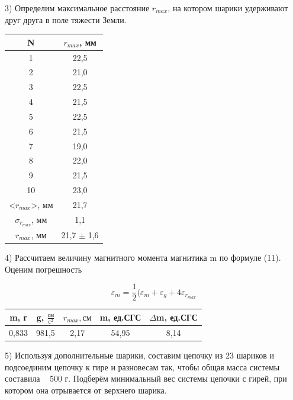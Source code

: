 \documentclass[a4paper,12pt]{article}
\begin{document}
3) Определим максимальное расстояние $r_{max}$, на котором шарики удерживают друг друга в поле тяжести Земли.

\begin{center}
\begin{tabular}{|c|c|}
	\hline
	N & $r_{max}$, мм \\
	\hline
	1 & 22,5 \\
	\hline
	2 & 21,0 \\
	\hline
	3 & 22,5 \\
	\hline
	4 & 21,5 \\
	\hline
	5 & 22,5 \\
	\hline
	6 & 21,5 \\
	\hline
	7 & 19,0 \\
	\hline
	8 & 22,0 \\
	\hline
	9 & 21,5 \\
	\hline
	10 & 23,0 \\
	\hline
	<$r_{max}$>, мм & 21,7 \\
	\hline
	$\sigma_{r_{max}}$, мм & 1,1\\
	\hline
	$r_{max}$, мм & 21,7 $\pm$ 1,6 \\
	\hline
\end{tabular}
\end{center}

4) Рассчитаем величину магнитного момента магнитика m по формуле (11). Оценим погрешность 

$$ \varepsilon_m = \frac{1}{2}(\varepsilon_m + \varepsilon_g + 4\varepsilon_{r_{max}}  $$

\begin{center}
\begin{tabular}{|c|c|c|c|c|}
	\hline
	m, г & g, $\frac{см}{с^2}$ & $r_{max}, см$ & m, ед.СГС & $\Delta$m, ед.СГС \\
	\hline
	0,833 & 981,5 & 2,17 & 54,95 & 8,14 \\
	\hline
\end{tabular}
\end{center}

5) Используя дополнительные шарики, составим цепочку из 23 шариков и подсоединим цепочку к гире и разновесам так, чтобы общая масса системы составила ~ 500 г. Подберём минимальный вес системы цепочки с гирей, при котором она отрывается от верхнего шарика. 
\end{document}
